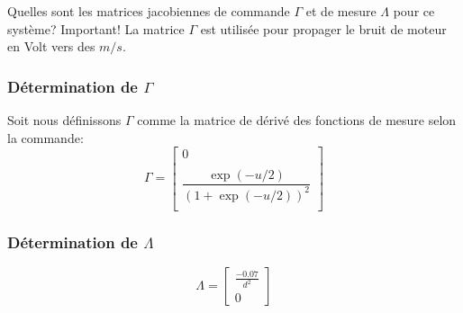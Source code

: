 \documentclass[12pt]{article}
\begin{document}
Quelles sont les matrices jacobiennes de commande $\Gamma$ et de mesure $\Lambda$ pour ce système? Important! La matrice $\Gamma$ est utilisée pour propager le bruit de moteur en Volt vers des $m/s$.

\subsubsection{Détermination de $\Gamma$}
Soit nous définissons $\Gamma$ comme la matrice de dérivé des fonctions de mesure selon la commande:
\begin{equation}
\Gamma =
\begin{bmatrix}
    0   \\
    \\
    \dfrac{\exp(-u/2)}{(1+\exp(-u/2))^2} \\
\end{bmatrix}
\end{equation}

\subsubsection{Détermination de $\Lambda$}
\begin{equation}
\Lambda =
\begin{bmatrix}
    \frac{-0.07}{d^2}   \\
    0
\end{bmatrix}
\end{equation}
\end{document}

